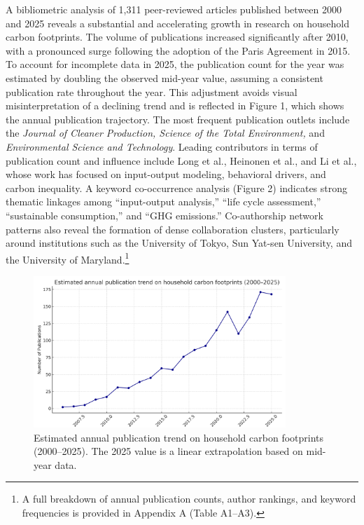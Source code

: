 \documentclass[12pt,a4paper]{article}%
\begin{document}
A bibliometric analysis of 1,311 peer-reviewed articles published between 2000 and 2025 reveals a substantial and accelerating growth in research on household carbon footprints. The volume of publications increased significantly after 2010, with a pronounced surge following the adoption of the Paris Agreement in 2015. To account for incomplete data in 2025, the publication count for the year was estimated by doubling the observed mid-year value, assuming a consistent publication rate throughout the year. This adjustment avoids visual misinterpretation of a declining trend and is reflected in Figure 1, which shows the annual publication trajectory. The most frequent publication outlets include the \textit{Journal of Cleaner Production, Science of the Total Environment,} and \textit{Environmental Science and Technology}. Leading contributors in terms of publication count and influence include Long et al., Heinonen et al., and Li et al., whose work has focused on input-output modeling, behavioral drivers, and carbon inequality. A keyword co-occurrence analysis (Figure 2) indicates strong thematic linkages among “input-output analysis,” “life cycle assessment,” “sustainable consumption,” and “GHG emissions.” Co-authorship network patterns also reveal the formation of dense collaboration clusters, particularly around institutions such as the University of Tokyo, Sun Yat-sen University, and the University of Maryland.\footnote{A full breakdown of annual publication counts, author rankings, and keyword frequencies is provided in Appendix A (Table A1–A3).}

\begin{figure}[htbp]
    \centering
    \includegraphics[width=0.85\textwidth]{publication_trend_darkblue_estimated2025.png}
    \caption{\small{Estimated annual publication trend on household carbon footprints (2000–2025). The 2025 value is a linear extrapolation based on mid-year data.}}
\end{figure}
\end{document}
